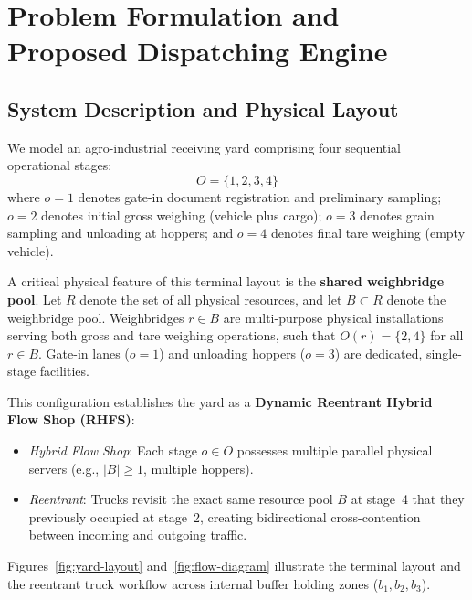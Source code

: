 \documentclass[12pt,a4paper]{article}
\begin{document}
\section{Problem Formulation and Proposed Dispatching Engine}
\label{sec:model}

\subsection{System Description and Physical Layout}
We model an agro-industrial receiving yard comprising four sequential operational stages:
\begin{equation}
  O = \{1, 2, 3, 4\}
\end{equation}
where $o=1$ denotes gate-in document registration and preliminary sampling; $o=2$ denotes initial gross weighing (vehicle plus cargo); $o=3$ denotes grain sampling and unloading at hoppers; and $o=4$ denotes final tare weighing (empty vehicle). 

A critical physical feature of this terminal layout is the \textbf{shared weighbridge pool}. Let $R$ denote the set of all physical resources, and let $B \subset R$ denote the weighbridge pool. Weighbridges $r \in B$ are multi-purpose physical installations serving both gross and tare weighing operations, such that $O(r) = \{2, 4\}$ for all $r \in B$. Gate-in lanes ($o=1$) and unloading hoppers ($o=3$) are dedicated, single-stage facilities. 

This configuration establishes the yard as a \textbf{Dynamic Reentrant Hybrid Flow Shop (RHFS)}:
\begin{itemize}[leftmargin=1.2cm,itemsep=0pt,topsep=2pt]
  \item \emph{Hybrid Flow Shop}: Each stage $o \in O$ possesses multiple parallel physical servers (e.g., $|B| \ge 1$, multiple hoppers).
  \item \emph{Reentrant}: Trucks revisit the exact same resource pool $B$ at stage~4 that they previously occupied at stage~2, creating bidirectional cross-contention between incoming and outgoing traffic.
\end{itemize}

Figures~\ref{fig:yard-layout} and~\ref{fig:flow-diagram} illustrate the terminal layout and the reentrant truck workflow across internal buffer holding zones ($b_1, b_2, b_3$).
\end{document}
